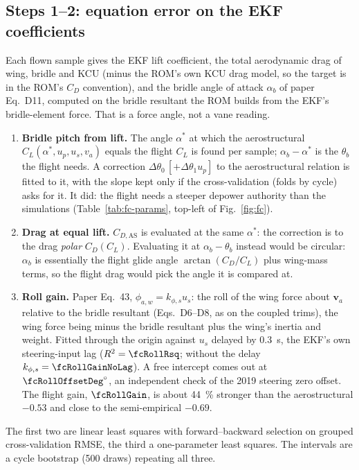 \documentclass[11pt,a4paper]{article}
\begin{document}
\subsection{Steps 1--2: equation error on the EKF coefficients}
Each flown sample gives the EKF lift coefficient, the total aerodynamic drag of
wing, bridle and KCU (minus the ROM's own KCU drag model, so the target is in
the ROM's $C_D$ convention), and the bridle angle of attack $\alpha_b$ of paper
Eq.~D11, computed on the bridle resultant the ROM builds from the EKF's
bridle-element force. That is a force angle, not a vane reading.
\begin{enumerate}
  \item \textbf{Bridle pitch from lift.} The angle $\alpha^*$ at which the
        aerostructural $C_L(\alpha^*, u_p, u_s, v_a)$ equals the flight
        $C_L$ is found per sample; $\alpha_b-\alpha^*$ is the $\theta_b$ the
        flight needs. A correction $\Delta\theta_0\,[+\Delta\theta_1u_p]$ to the
        aerostructural relation is fitted to it, with the slope kept only if
        the cross-validation (folds by cycle) asks for it. It did: the flight
        needs a steeper depower authority than the simulations
        (Table~\ref{tab:fc-params}, top-left of Fig.~\ref{fig:fc}).
  \item \textbf{Drag at equal lift.} $C_{D,\mathrm{AS}}$ is evaluated at
        the same $\alpha^*$: the correction is to the drag \emph{polar}
        $C_D(C_L)$. Evaluating it at $\alpha_b-\theta_b$ instead would be
        circular: $\alpha_b$ is essentially the flight glide angle
        $\arctan(C_D/C_L)$ plus wing-mass terms, so the flight drag would pick
        the angle it is compared at.
  \item \textbf{Roll gain.} Paper Eq.~43, $\phi_{a,w}=k_{\phi,s}u_s$: the
        roll of the wing force about $\mathbf v_a$ relative to the bridle
        resultant (Eqs.~D6--D8, as on the coupled trims), the wing force being
        minus the bridle resultant plus the wing's inertia and weight. Fitted
        through the origin against $u_s$ delayed by \SI{0.3}{\second}, the
        EKF's own steering-input lag ($R^2=\fcRollRsq$; without the delay
        $k_{\phi,s}=\fcRollGainNoLag$). A free intercept comes out at
        $\fcRollOffsetDeg^\circ$, an independent check of the 2019 steering
        zero offset. The flight gain, $\fcRollGain$, is about
        \SI{44}{\percent} stronger than the aerostructural $-0.53$ and close
        to the semi-empirical $-0.69$.
\end{enumerate}
The first two are linear least squares with forward--backward selection on
grouped cross-validation RMSE, the third a one-parameter least squares. The
intervals are a cycle bootstrap (\num{500} draws) repeating all three.
\end{document}
